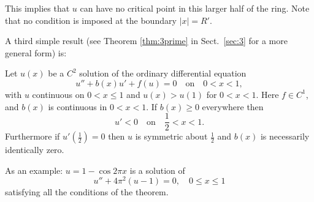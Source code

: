 This implies that $u$ can have no critical point in this larger half of the ring. 
Note that no condition is imposed at the boundary $|x|=R'$.

A third simple result (see Theorem \ref{thm:3prime} in Sect.~\ref{sec:3}
for a more general form) is:

\begin{theorem}\label{thm:3}
  Let $u(x)$ be a $C^2$ solution of the ordinary differential equation
  \begin{equation}\label{eq:1.3}
    u'' + b(x)u' + f(u) = 0\quad \text{on} \quad 0<x<1,
  \end{equation}
  with $u$ continuous on $0<x\leq 1$ and $u(x)>u(1)$ for $0<x<1$.
  Here $f\in C^1$, and $b(x)$ is continuous in $0<x<1$.
  If $b(x)\geq 0$ everywhere then
  \begin{equation}\label{eq:1.4}
    u' < 0\quad \text{on} \quad \frac12 < x < 1.
  \end{equation}
  Furthermore if $u'(\frac12) = 0$ then $u$ is symmetric about $\frac12$
  and $b(x)$ is necessarily identically zero.
\end{theorem}

As an example: $u = 1 - \cos 2\pi x$ is a solution of
\[u'' + 4\pi^2(u-1) = 0, \quad 0\leq x\leq 1\]
satisfying all the conditions of the theorem.

\medskip

